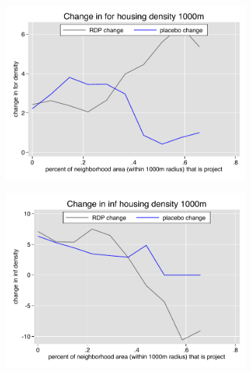 \documentclass[12pt]{article}
\begin{document}
\begin{figure}
\begin{subfigure}[b]{0.495\textwidth}
        \end{subfigure}
        \vspace{-6mm}
        \begin{subfigure}[b]{0.495\textwidth}
            \centering
            \includegraphics[width=\textwidth,trim={0.3cm .3cm 0.1cm 0cm}, clip=true]{figures/change_for_1000_local.pdf}
        \end{subfigure}
        \hfill
        \begin{subfigure}[b]{0.495\textwidth}  
            \centering 
            \includegraphics[width=\textwidth,trim={0.3cm .3cm 0.1cm 0cm}, clip=true]{figures/change_inf_1000_local.pdf}
        \end{subfigure}
        \vspace{-6mm}
    \end{figure} 
\end{document}
